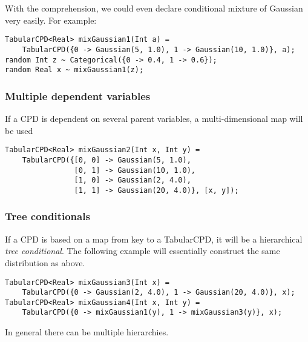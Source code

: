 \documentclass[12pt]{article}
\begin{document}
With the comprehension, we could even declare conditional mixture of Gaussian very easily. For example:
\begin{verbatim}
TabularCPD<Real> mixGaussian1(Int a) = 
    TabularCPD({0 -> Gaussian(5, 1.0), 1 -> Gaussian(10, 1.0)}, a);
random Int z ~ Categorical({0 -> 0.4, 1 -> 0.6});
random Real x ~ mixGaussian1(z);
\end{verbatim}

\subsubsection{Multiple dependent variables}
If a CPD is dependent on several parent variables, a multi-dimensional map will be used
\begin{verbatim}
TabularCPD<Real> mixGaussian2(Int x, Int y) = 
    TabularCPD({[0, 0] -> Gaussian(5, 1.0), 
                [0, 1] -> Gaussian(10, 1.0),
                [1, 0] -> Gaussian(2, 4.0),
                [1, 1] -> Gaussian(20, 4.0)}, [x, y]);
\end{verbatim}


\subsubsection{Tree conditionals}
If a CPD is based on a map from key to a TabularCPD, it will be a hierarchical \emph{tree conditional}. 
The following example will essentially construct the same distribution as above.
\begin{verbatim}
TabularCPD<Real> mixGaussian3(Int x) = 
    TabularCPD({0 -> Gaussian(2, 4.0), 1 -> Gaussian(20, 4.0)}, x);
TabularCPD<Real> mixGaussian4(Int x, Int y) = 
    TabularCPD({0 -> mixGaussian1(y), 1 -> mixGaussian3(y)}, x);
\end{verbatim}
In general there can be multiple hierarchies.
\end{document}
